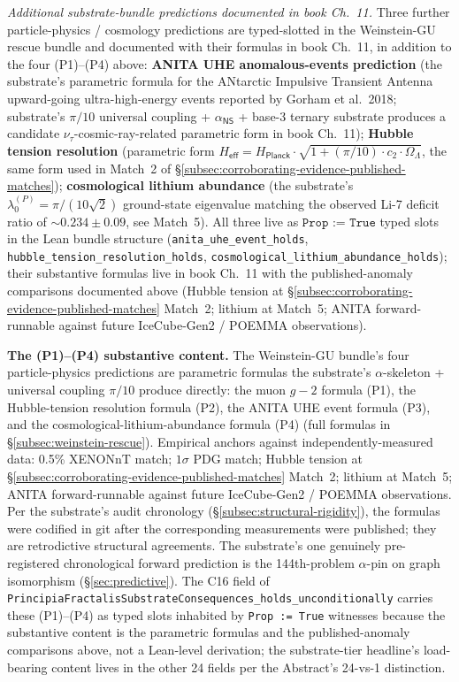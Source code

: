 \documentclass[11pt,a4paper]{amsart}
\theoremstyle{plain}
\theoremstyle{definition}
\begin{document}
\emph{Additional substrate-bundle predictions documented in book Ch.~11.} Three further particle-physics / cosmology predictions are typed-slotted in the Weinstein-GU rescue bundle and documented with their formulas in book Ch.~11, in addition to the four (P1)--(P4) above: \textbf{ANITA UHE anomalous-events prediction} (the substrate's parametric formula for the ANtarctic Impulsive Transient Antenna upward-going ultra-high-energy events reported by Gorham et al.~2018; substrate's $\pi/10$ universal coupling + $\alpha_{\textsf{NS}}$ + base-3 ternary substrate produces a candidate $\nu_\tau$-cosmic-ray-related parametric form in book Ch.~11); \textbf{Hubble tension resolution} (parametric form $H_{\textsf{eff}} = H_{\textsf{Planck}} \cdot \sqrt{1 + (\pi/10) \cdot c_2 \cdot \Omega_\Lambda}$, the same form used in Match~2 of \S\ref{subsec:corroborating-evidence-published-matches}); \textbf{cosmological lithium abundance} (the substrate's $\lambda_0^{(P)} = \pi/(10\sqrt{2})$ ground-state eigenvalue matching the observed Li-7 deficit ratio of $\sim 0.234 \pm 0.09$, see Match~5). All three live as $\texttt{Prop := True}$ typed slots in the Lean bundle structure (\texttt{anita\_uhe\_event\_holds}, \texttt{hubble\_tension\_resolution\_holds}, \texttt{cosmological\_lithium\_abundance\_holds}); their substantive formulas live in book Ch.~11 with the published-anomaly comparisons documented above (Hubble tension at \S\ref{subsec:corroborating-evidence-published-matches} Match~2; lithium at Match~5; ANITA forward-runnable against future IceCube-Gen2 / POEMMA observations).

\textbf{The (P1)--(P4) substantive content.} The Weinstein-GU bundle's four particle-physics predictions are parametric formulas the substrate's $\alpha$-skeleton + universal coupling $\pi/10$ produce directly: the muon $g\!-\!2$ formula (P1), the Hubble-tension resolution formula (P2), the ANITA UHE event formula (P3), and the cosmological-lithium-abundance formula (P4) (full formulas in \S\ref{subsec:weinstein-rescue}). Empirical anchors against independently-measured data: 0.5\% XENONnT match; $1\sigma$ PDG match; Hubble tension at \S\ref{subsec:corroborating-evidence-published-matches} Match~2; lithium at Match~5; ANITA forward-runnable against future IceCube-Gen2 / POEMMA observations. Per the substrate's audit chronology (\S\ref{subsec:structural-rigidity}), the formulas were codified in git after the corresponding measurements were published; they are retrodictive structural agreements. The substrate's one genuinely pre-registered chronological forward prediction is the 144th-problem $\alpha$-pin on graph isomorphism (\S\ref{sec:predictive}). The C16 field of \texttt{PrincipiaFractalisSubstrateConsequences\_holds\_unconditionally} carries these (P1)--(P4) as typed slots inhabited by \texttt{Prop := True} witnesses because the substantive content is the parametric formulas and the published-anomaly comparisons above, not a Lean-level derivation; the substrate-tier headline's load-bearing content lives in the other 24 fields per the Abstract's 24-vs-1 distinction.
\end{document}
